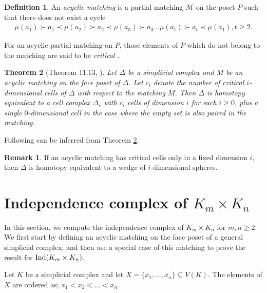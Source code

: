 \documentclass[12pt]{article}
\newtheorem{thm}{Theorem}
\numberwithin{thm}{section}
\theoremstyle{definition}
\newtheorem{defn}[thm]{Definition}
\newtheorem{rmk}{Remark}
\newcommand{\M}{\mathcal{M}}
\newcommand{\ind}{{\rm{Ind}}}
\begin{document}
 

 \begin{defn}
 	An {\it acyclic matching} is a partial matching  $\M$ on the poset $P$ such that there does not exist a cycle
 	\begin{eqnarray*}
 		\mu(a_1)  \succ a_1 \prec \mu( a_2) \succ a_2  \prec \mu( a_3) \succ a_3 \dots   \mu(a_t) \succ a_t  \prec \mu(a_1), t\geq 2.
 	\end{eqnarray*}
 \end{defn}
 

For an acyclic partial matching on $P$, those elements of $P$ which do not belong to the matching are said to be 
{\it critical }.

\begin{thm}[Theorem $11.13$, \cite{dk}]\label{acyc3}
Let $\Delta$ be a simplicial complex and $M$ be an acyclic matching on the face poset of $\Delta$. Let $c_i$ denote the number of critical $i$-dimensional cells of $\Delta$ with respect to the matching $M$. Then $\Delta$ is homotopy equivalent to a cell complex $\Delta_c$ with $c_i$ cells of dimension $i$ for each $i \geq 0$, plus a single $0$-dimensional cell in the case where the empty set is also paired in the matching.
\end{thm}

Following can be inferred from Theorem \ref{acyc3}.

\begin{rmk} \label{acyc4}
If an acyclic matching has critical cells only in a fixed dimension $i$, then $\Delta$ is homotopy equivalent to a wedge of $i$-dimensional spheres.
\end{rmk}

  \section{Independence complex of \texorpdfstring{$K_m \times K_n$}{categorical product of complete graphs}}\label{sec:productofcomplete}
In this section, we compute the independence complex of $K_m \times K_n$ for $m,n \geq 2$.
We first  start by defining an acyclic matching on the face poset of a general simplicial complex; and then use a special case of this matching to prove the result for $\ind(K_m \times K_n)$.

  Let $K$ be a simplicial complex and let $X = \{x_1, \ldots, x_n\}\subseteq V(K)$. The elements of $X$ are ordered as; $
  x_1 < x_2 < \ldots <  x_n.
  $
  
\end{document}
